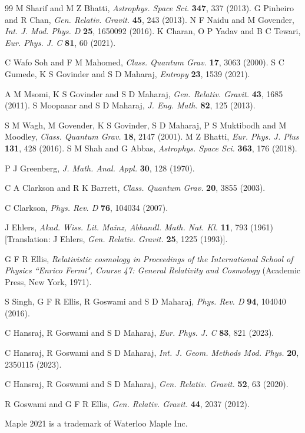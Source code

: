 \documentclass[abstract=on,notitlepage,superscriptaddress,nofootinbib,aps,showpacs,twocolumn,prd]{revtex4}
\newcommand{\0}{^{(0)}}
\newcommand{\1}{^{(1)}}
\newcommand{\2}{^{(2)}}
\newcommand{\3}{{}^{(3)}}
\begin{document}
\begin{thebibliography}{99}
M Sharif and M Z Bhatti, \textit{Astrophys. Space Sci.} \textbf{347}, 337 (2013). 
 G Pinheiro and R Chan, \textit{Gen. Relativ. Gravit.} \textbf{45}, 243 (2013). 
 N F Naidu and M Govender, \textit{Int. J. Mod. Phys. D} \textbf{25}, 1650092 (2016).
 K Charan, O P Yadav and B C Tewari, \textit{Eur. Phys. J. C} \textbf{81}, 60 (2021). 


 C Wafo Soh and F M Mahomed, \textit{Class. Quantum Grav.} \textbf{17}, 3063 (2000).
 S C Gumede, K S Govinder and S D Maharaj, \textit{Entropy} \textbf{23}, 1539 (2021). 

 A M Msomi, K S Govinder and S D Maharaj, \textit{Gen. Relativ. Gravit.} \textbf{43}, 1685 (2011).
 S Moopanar and S D Maharaj, \textit{J. Eng. Math.} \textbf{82}, 125 (2013).

 S M Wagh, M Govender, K S Govinder, S D Maharaj, P S Muktibodh and M Moodley, \textit{Class. Quantum Grav.} \textbf{18}, 2147 (2001).
  M Z Bhatti, \textit{Eur. Phys. J. Plus} \textbf{131}, 428 (2016).
 S M Shah and G Abbas, \textit{Astrophys. Space Sci.} \textbf{363}, 176 (2018).


 P J Greenberg, \textit{J. Math. Anal. Appl.} \textbf{30}, 128 (1970).

 C A Clarkson and R K Barrett,  \textit{Class. Quantum Grav.} \textbf{20}, 3855 (2003).

 C Clarkson,  \textit{Phys. Rev. D} \textbf{76}, 104034 (2007).

 J Ehlers,  \textit{Akad. Wiss. Lit. Mainz, Abhandl. Math. Nat. Kl.} \textbf{11}, 793 (1961) [Translation: J Ehlers, \textit{Gen. Relativ. Gravit.} \textbf{25}, 1225 (1993)].

 G F R Ellis,  \textit{Relativistic cosmology in Proceedings of the International School of Physics ``Enrico Fermi", Course 47: General Relativity and Cosmology} (Academic Press, New York, 1971).

 S Singh, G F R Ellis, R Goswami and S D Maharaj, \textit{Phys. Rev. D} \textbf{94}, 104040 (2016).

 C Hansraj,  R Goswami and S D Maharaj,  \textit{Eur. Phys. J. C} \textbf{83}, 821 (2023).

 C Hansraj, R Goswami and S D Maharaj, \textit{Int. J. Geom. Methods Mod. Phys.} \textbf{20}, 2350115 (2023).

 C Hansraj,  R Goswami and S D Maharaj,  \textit{Gen. Relativ. Gravit.} \textbf{52}, 63 (2020).



 R Goswami and G F R Ellis, \textit{Gen. Relativ. Gravit.} \textbf{44}, 2037 (2012).

 Maple 2021 is a trademark of Waterloo Maple Inc.
	 
\end{thebibliography}	 
\end{document}
